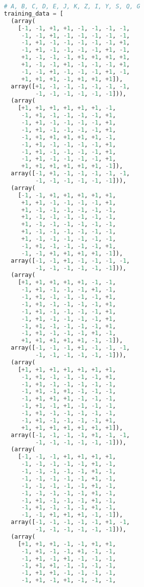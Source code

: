 \documentclass{article}
\begin{document}
\begin{lstlisting}[language=Python]
# A, B, C, D, E, J, K, Z, I, Y, S, Q, G
training_data = [
  (array(
    [-1, -1, +1, +1, -1, -1, -1, -1, 
     -1, -1, +1, -1, -1, -1, -1, -1, 
     -1, +1, -1, -1, -1, -1, -1, +1, 
     -1, +1, -1, -1, -1, -1, +1, -1, 
     +1, -1, -1, -1, +1, +1, +1, +1, 
     +1, -1, -1, +1, -1, -1, -1, +1, 
     -1, -1, +1, -1, -1, -1, +1, -1, 
     +1, +1, +1, -1, +1, +1, +1]), 
  array([+1, -1, -1, -1, -1, -1, -1, 
         -1, -1, -1, -1, -1, -1])),
  (array(
    [+1, +1, +1, +1, +1, +1, -1, 
     -1, +1, -1, -1, -1, -1, +1, 
     -1, +1, -1, -1, -1, -1, +1, 
     -1, +1, -1, -1, -1, -1, +1, 
     -1, +1, +1, +1, +1, +1, -1, 
     -1, +1, -1, -1, -1, -1, +1, 
     -1, +1, -1, -1, -1, -1, +1, 
     -1, +1, -1, -1, -1, -1, +1, 
     +1, +1, +1, +1, +1, +1, -1]), 
  array([-1, +1, -1, -1, -1, -1, -1, 
         -1, -1, -1, -1, -1, -1])),
  (array(
    [-1, -1, +1, +1, +1, +1, +1, 
     +1, +1, -1, -1, -1, -1, +1, 
     +1, -1, -1, -1, -1, -1, -1, 
     +1, -1, -1, -1, -1, -1, -1, 
     +1, -1, -1, -1, -1, -1, -1, 
     +1, -1, -1, -1, -1, -1, -1, 
     +1, -1, -1, -1, -1, -1, -1, 
     -1, +1, -1, -1, -1, -1, +1, 
     -1, -1, +1, +1, +1, +1, -1]), 
  array([-1, -1, +1, -1, -1, -1, -1, 
         -1, -1, -1, -1, -1, -1])),
  (array(
    [+1, +1, +1, +1, +1, -1, -1, 
     -1, +1, -1, -1, -1, +1, -1, 
     -1, +1, -1, -1, -1, -1, +1, 
     -1, +1, -1, -1, -1, -1, +1, 
     -1, +1, -1, -1, -1, -1, +1, 
     -1, +1, -1, -1, -1, -1, +1,
     -1, +1, -1, -1, -1, -1, +1, 
     -1, +1, -1, -1, -1, +1, -1, 
     +1, +1, +1, +1, +1, -1, -1]), 
  array([-1, -1, -1, +1, -1, -1, -1, 
         -1, -1, -1, -1, -1, -1])),
  (array(
    [+1, +1, +1, +1, +1, +1, +1, 
     -1, +1, -1, -1, -1, -1, +1, 
     -1, +1, -1, -1, -1, -1, -1, 
     -1, +1, -1, +1, -1, -1, -1, 
     -1, +1, +1, +1, -1, -1, -1, 
     -1, +1, -1, +1, -1, -1, -1, 
     -1, +1, -1, -1, -1, -1, -1, 
     -1, +1, -1, -1, -1, -1, +1, 
     +1, +1, +1, +1, +1, +1, +1]), 
  array([-1, -1, -1, -1, +1, -1, -1, 
         -1, -1, -1, -1, -1, -1])),
  (array(
    [-1, -1, -1, +1, +1, +1, +1, 
     -1, -1, -1, -1, -1, +1, -1, 
     -1, -1, -1, -1, -1, +1, -1, 
     -1, -1, -1, -1, -1, +1, -1, 
     -1, -1, -1, -1, -1, +1, -1, 
     -1, -1, -1, -1, -1, +1, -1, 
     -1, +1, -1, -1, -1, +1, -1, 
     -1, +1, -1, -1, -1, +1, -1, 
     -1, -1, +1, +1, +1, -1, -1]), 
  array([-1, -1, -1, -1, -1, +1, -1, 
         -1, -1, -1, -1, -1, -1])),
  (array(
    [+1, +1, +1, -1, -1, +1, +1, 
     -1, +1, -1, -1, +1, -1, -1, 
     -1, +1, -1, +1, -1, -1, -1,
     -1, +1, +1, -1, -1, -1, -1, 
     -1, +1, +1, -1, -1, -1, -1, 
     -1, +1, -1, +1, -1, -1, -1,

\end{lstlisting}
\end{document}
